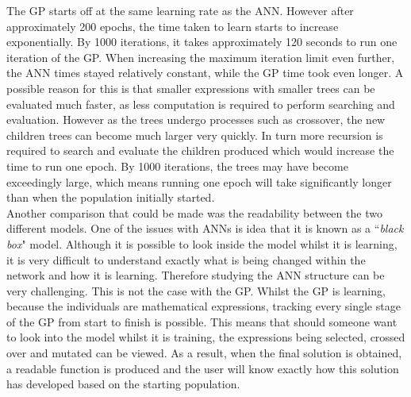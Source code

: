 \documentclass[11pt]{article}
\begin{document}
The GP starts off at the same learning rate as the ANN. However after approximately 200 epochs, the time taken to learn starts to increase exponentially. By 1000 iterations, it takes approximately 120 seconds to run one iteration of the GP. When increasing the maximum iteration limit even further, the ANN times stayed relatively constant, while the GP time took even longer.  A possible reason for this is that smaller expressions with smaller trees can be evaluated much faster, as less computation is required to perform searching and evaluation. However as the trees undergo processes such as crossover, the new children trees can become much larger very quickly. In turn more recursion is required to search and evaluate the children produced which would increase the time to run one epoch. By 1000 iterations, the trees may have become exceedingly large, which means running one epoch will take significantly longer than when the population initially started. \\
Another comparison that could be made was the readability between the two different models. One of the issues with ANNs is idea that it is known as a ``\textit{black box}" model. Although it is possible to look inside the model whilst it is learning, it is very difficult to understand exactly what is being changed within the network and how it is learning. Therefore studying the ANN structure can be very challenging. This is not the case with the GP. Whilst the GP is learning, because the individuals are mathematical expressions, tracking every single stage of the GP from start to finish is possible. This means that should someone want to look into the model whilst it is training, the expressions being selected, crossed over and mutated can be viewed. As a result, when the final solution is obtained, a readable function is produced and the user will know exactly how this solution has developed based on the starting population. \\
\end{document}

